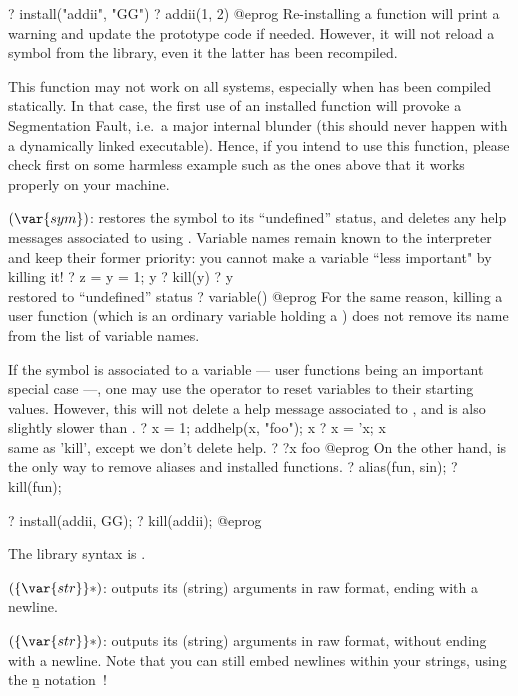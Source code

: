 \bprog
? install("addii", "GG")
? addii(1, 2)
@eprog\noindent
Re-installing a function will print a warning and update the prototype code
if needed. However, it will not reload a symbol from the library, even it the
latter has been recompiled.

 This function may not work on all systems, especially
when  has been compiled statically. In that case, the first use of an
installed function will provoke a Segmentation Fault, i.e.~a major internal
blunder (this should never happen with a dynamically linked executable).
Hence, if you intend to use this function, please check first on some
harmless example such as the ones above that it works properly on your
machine.

$(\var{sym})$: \label{se:kill}restores the symbol  to its ``undefined'' status, and deletes any
help messages associated to  using . Variable names
remain known to the interpreter and keep their former priority: you cannot
make a variable ``less important" by killing it!
\bprog
? z = y = 1; y
? kill(y)
? y            \\ restored to ``undefined'' status
? variable()
@eprog\noindent
For the same reason, killing a user function (which is an ordinary
variable holding a ) does not remove its name from the list of
variable names.

If the symbol is associated to a variable --- user functions being an
important special case ---, one may use the  operator
 to reset variables to their starting values. However, this
will not delete a help message associated to , and is also slightly
slower than .
\bprog
? x = 1; addhelp(x, "foo"); x
? x = 'x; x   \\ same as 'kill', except we don't delete help.
? ?x
foo
@eprog\noindent
On the other hand,  is the only way to remove aliases and installed
functions.
\bprog
? alias(fun, sin);
? kill(fun);

? install(addii, GG);
? kill(addii);
@eprog

The library syntax is .

$(\{\var{str}\}*)$: \label{se:print}outputs its (string) arguments in raw format, ending with a newline.

$(\{\var{str}\}*)$: \label{se:print1}outputs its (string) arguments in raw
format, without ending with a newline. Note that you can still embed newlines
within your strings, using the \b{n} notation~!

